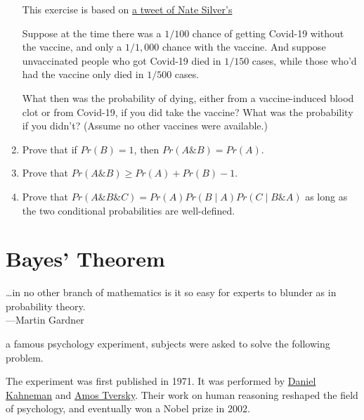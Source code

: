 \documentclass[justified]{tufte-book}
\newcommand{\given}{\mid}
\renewcommand{\wedge}{\mathbin{\&}}
\newcommand{\p}{Pr}
\newenvironment{epigraph}%
{
\begin{flushright}    
\begin{minipage}{20em}
\begin{flushright}
\itshape
}%
{
\end{flushright}
\end{minipage}
\end{flushright}
}
\theoremstyle{definition}
\theoremstyle{definition}
\theoremstyle{definition}
\theoremstyle{definition}
\theoremstyle{remark}
\begin{document}
\begin{enumerate}
  \begin{marginfigure}
  This exercise is based on
  \href{https://twitter.com/NateSilver538/status/1381968804004065299}{a
  tweet of Nate Silver's}
  \end{marginfigure}

  Suppose at the time there was a \(1/100\) chance of getting Covid-19 without the vaccine, and only a \(1/1,000\) chance with the vaccine. And suppose unvaccinated people who got Covid-19 died in \(1/150\) cases, while those who'd had the vaccine only died in \(1/500\) cases.

  What then was the probability of dying, either from a vaccine-induced blood clot or from Covid-19, if you did take the vaccine? What was the probability if you didn't? (Assume no other vaccines were available.)
\item
  Prove that if \(\p(B) = 1\), then \(\p(A \wedge B) = \p(A)\).
\item
  Prove that \(\p(A \wedge B) \geq \p(A) + \p(B) - 1\).
\item
  Prove that \(\p(A \wedge B \wedge C) = \p(A) \p(B \given A) \p(C \given B \wedge A)\) as long as the two conditional probabilities are well-defined.
\end{enumerate}

\hypertarget{chbayes}{%
\chapter{Bayes' Theorem}\label{chbayes}}

\begin{epigraph}
\ldots in no other branch of mathematics is it so easy for experts to
blunder as in probability theory.\\
---Martin Gardner
\end{epigraph}

 a famous psychology experiment, subjects were asked to solve the following problem.

\begin{marginfigure}
The experiment was first published in 1971. It was performed by
\href{https://en.wikipedia.org/wiki/Daniel_Kahneman}{Daniel Kahneman}
and \href{https://en.wikipedia.org/wiki/Amos_Tversky}{Amos Tversky}.
Their work on human reasoning reshaped the field of psychology, and
eventually won a Nobel prize in 2002.
\end{marginfigure}
\end{document}
